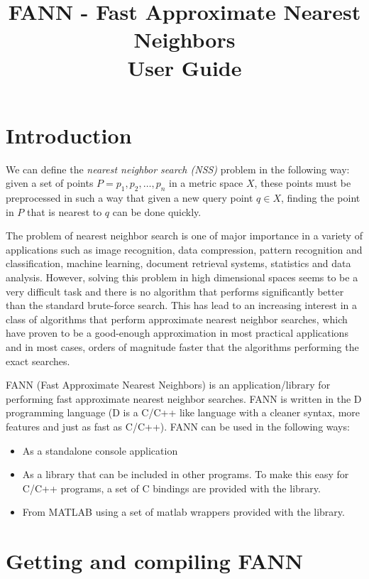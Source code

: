 \documentclass[letter,10pt]{article}
\title{FANN - Fast Approximate Nearest Neighbors\\User Guide}
\date{}
\begin{document}
\maketitle



\section{Introduction}

We can define the \emph{nearest neighbor search (NSS)} problem in the following way: given a set of points $P=p_1,p_2,\dots,p_n$ in a metric space $X$, these points must be preprocessed in such a way that given a new query point $q \in X$, finding the point in $P$ that is nearest to $q$ can be done quickly.

The problem of nearest neighbor search is one of major importance in a variety of applications such as image recognition, data compression, pattern recognition and classification, machine learning,  document retrieval systems, statistics and data analysis. However, solving this problem in high dimensional spaces seems to be a very difficult task and there is no algorithm that performs significantly better than the standard brute-force search. This has lead to an increasing interest in a class of algorithms that perform approximate nearest neighbor searches, which have proven to be a good-enough approximation in most practical applications and in most cases, orders of magnitude faster that the algorithms performing the exact searches.

FANN (Fast Approximate Nearest Neighbors) is an application/library for performing fast approximate nearest neighbor searches. FANN is written in the D programming language (D is a C/C++ like language with a cleaner syntax, more features and just as fast as C/C++). FANN can be used in the following ways:
\begin{itemize}
 \item As a standalone console application
\item As a library that can be included in other programs. To make this easy for C/C++ programs, a set of C bindings are provided with the library.
\item From MATLAB using a set of matlab wrappers provided with the library.
\end{itemize}


\section{Getting and compiling FANN}
\end{document}
